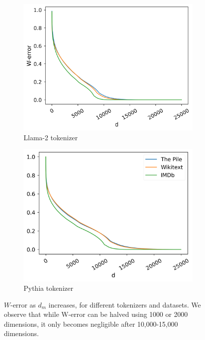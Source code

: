 \begin{figure}[h]
\centering
    \begin{subfigure}{0.415\columnwidth}
         \includegraphics[width=\linewidth]{sources/part_1/softmax_bottleneck/imgs/llama_sv_4gram.png}
         \caption{Llama-2 tokenizer}
         \label{fig:llama}
    \end{subfigure}
    \begin{subfigure}{0.4\columnwidth}
         \includegraphics[width=\linewidth]{sources/part_1/softmax_bottleneck/imgs/pythia_sv_4gram.png}
         \caption{Pythia tokenizer}
         \label{fig:pythia}
    \end{subfigure}
    \caption{$W$\!-error as $d_m$ increases, for different tokenizers and datasets. We observe that while W-error can be halved using 1000 or 2000 dimensions, it only becomes negligible after 10,000-15,000 dimensions.}
    \label{fig:w_error}
\end{figure}

